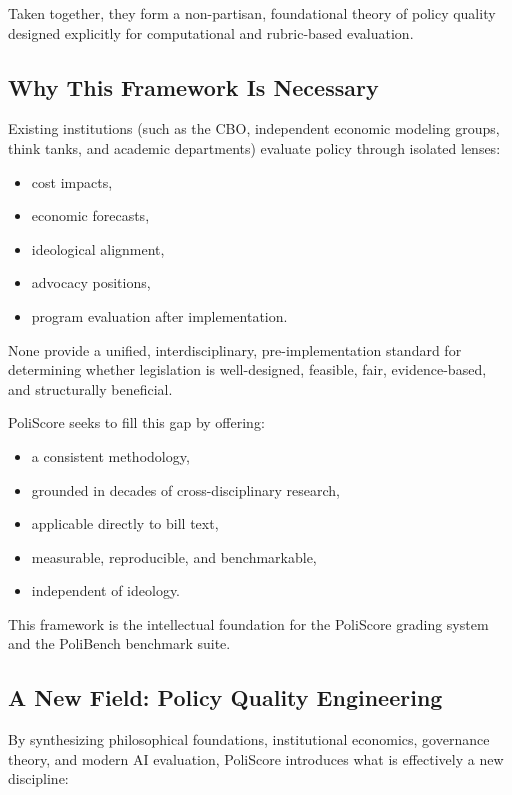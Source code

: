 \documentclass[12pt]{article}
\begin{document}
Taken together, they form a non-partisan, foundational theory of policy quality designed explicitly for computational
and rubric-based evaluation.

\subsection{Why This Framework Is Necessary}

Existing institutions (such as the CBO, independent economic modeling groups, think tanks, and academic departments)
evaluate policy through isolated lenses:

\begin{itemize}
    \item cost impacts,
    \item economic forecasts,
    \item ideological alignment,
    \item advocacy positions,
    \item program evaluation after implementation.
\end{itemize}

None provide a unified, interdisciplinary, pre-implementation standard for determining whether legislation is well-designed,
feasible, fair, evidence-based, and structurally beneficial.

PoliScore seeks to fill this gap by offering:

\begin{itemize}
    \item a consistent methodology,
    \item grounded in decades of cross-disciplinary research,
    \item applicable directly to bill text,
    \item measurable, reproducible, and benchmarkable,
    \item independent of ideology.
\end{itemize}

This framework is the intellectual foundation for the PoliScore grading system and the PoliBench benchmark suite.

\subsection{A New Field: Policy Quality Engineering}

By synthesizing philosophical foundations, institutional economics, governance theory, and modern AI evaluation, PoliScore
introduces what is effectively a new discipline:
\end{document}
